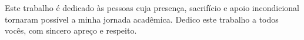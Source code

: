Este trabalho é dedicado às pessoas cuja presença, sacrifício e apoio incondicional tornaram possível a minha jornada acadêmica.
Dedico este trabalho a todos vocês, com sincero apreço e respeito.
